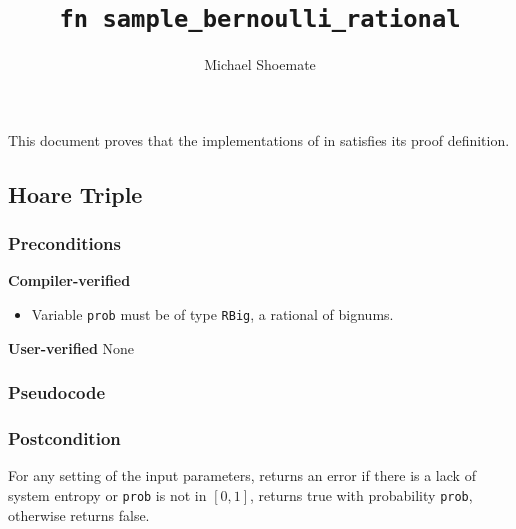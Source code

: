 \documentclass{article}
\title{\texttt{fn sample\_bernoulli\_rational}}
\author{Michael Shoemate}
\begin{document}
 
\maketitle 
 
This document proves that the implementations of  in   
satisfies its proof definition. 
 
\subsection{Hoare Triple} 
\subsubsection*{Preconditions} 
\textbf{Compiler-verified} 
\begin{itemize} 
    \item Variable \texttt{prob} must be of type \texttt{RBig}, a rational of bignums. 
\end{itemize} 
 
\textbf{User-verified} 
None 
 
\subsubsection*{Pseudocode} 
 
 
 
\subsubsection*{Postcondition} 
\begin{definition} 
    \label{sample-bernoulli} 
 
    For any setting of the input parameters, 
    returns an error if there is a lack of system entropy or \texttt{prob} is not in $[0, 1]$, 
    returns true with probability \texttt{prob}, otherwise returns false. 
\end{definition} 
 
\end{document}
